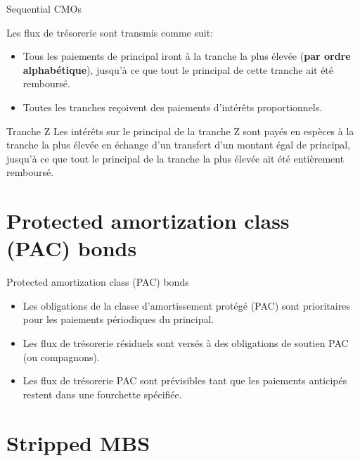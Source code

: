 \documentclass{beamer}
\begin{document}
\begin{frame}{Sequential CMOs}
\begin{block}{Les flux de trésorerie sont transmis comme suit:}
\begin{itemize}[label=\bullet]
\item Tous les paiements de principal iront à la tranche la plus élevée (\textbf{par ordre alphabétique}), jusqu'à ce que tout le principal de cette tranche ait été remboursé.
\item Toutes les tranches reçoivent des paiements d'intérêts proportionnels.
\end{itemize}
\end{block}

\begin{block}{Tranche Z}
Les intérêts sur le principal de la tranche Z sont payés en espèces à la tranche la plus élevée en échange d'un transfert d'un montant égal de principal, jusqu'à ce que tout le principal de la tranche la plus élevée ait été entièrement remboursé.
\end{block}
\end{frame}

\section{Protected amortization class (PAC) bonds}

\begin{frame}{Protected amortization class (PAC) bonds}
\begin{itemize}[label=\bullet]
\item Les obligations de la classe d'amortissement protégé (PAC) sont prioritaires pour les paiements périodiques du principal.

\vspace{0.5cm}


\item Les flux de trésorerie résiduels sont versés à des obligations de soutien PAC (ou compagnons).

\vspace{0.5cm}

\item Les flux de trésorerie PAC sont prévisibles tant que les paiements anticipés restent dans une fourchette spécifiée.
\end{itemize}
\end{frame}


\section{Stripped MBS}
\end{document}
